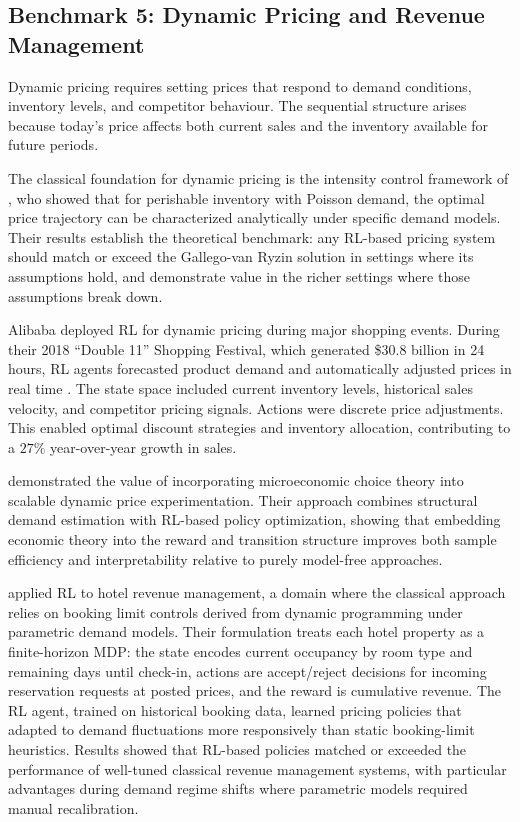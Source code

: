 \subsection{Benchmark 5: Dynamic Pricing and Revenue Management}
\label{sec:benchmark_hotel}

Dynamic pricing requires setting prices that respond to demand conditions, inventory levels, and competitor behaviour. The sequential structure arises because today's price affects both current sales and the inventory available for future periods.

The classical foundation for dynamic pricing is the intensity control framework of \citet{Gallego1994pricing}, who showed that for perishable inventory with Poisson demand, the optimal price trajectory can be characterized analytically under specific demand models. Their results establish the theoretical benchmark: any RL-based pricing system should match or exceed the Gallego-van Ryzin solution in settings where its assumptions hold, and demonstrate value in the richer settings where those assumptions break down.

Alibaba deployed RL for dynamic pricing during major shopping events. During their 2018 ``Double 11'' Shopping Festival, which generated \$30.8 billion in 24 hours, RL agents forecasted product demand and automatically adjusted prices in real time \citep{Alibaba2019}. The state space included current inventory levels, historical sales velocity, and competitor pricing signals. Actions were discrete price adjustments. This enabled optimal discount strategies and inventory allocation, contributing to a $27\%$ year-over-year growth in sales.

\citet{Misra2019} demonstrated the value of incorporating microeconomic choice theory into scalable dynamic price experimentation. Their approach combines structural demand estimation with RL-based policy optimization, showing that embedding economic theory into the reward and transition structure improves both sample efficiency and interpretability relative to purely model-free approaches.

\citet{Chen2023hotelrl} applied RL to hotel revenue management, a domain where the classical approach relies on booking limit controls derived from dynamic programming under parametric demand models. Their formulation treats each hotel property as a finite-horizon MDP: the state encodes current occupancy by room type and remaining days until check-in, actions are accept/reject decisions for incoming reservation requests at posted prices, and the reward is cumulative revenue. The RL agent, trained on historical booking data, learned pricing policies that adapted to demand fluctuations more responsively than static booking-limit heuristics. Results showed that RL-based policies matched or exceeded the performance of well-tuned classical revenue management systems, with particular advantages during demand regime shifts where parametric models required manual recalibration.

